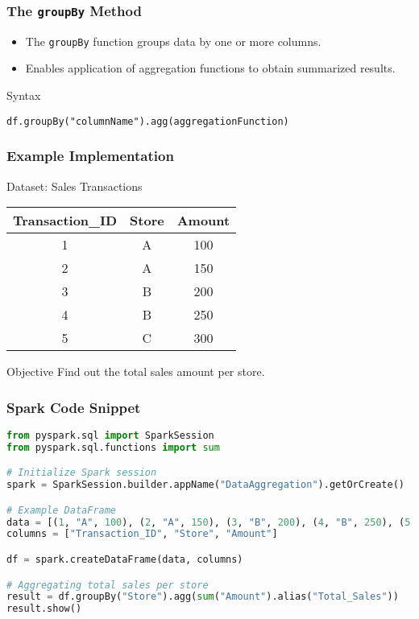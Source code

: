 \documentclass[aspectratio=169]{beamer}
\begin{document}
\begin{frame}[fragile]
    \frametitle{The \texttt{groupBy} Method}
    \begin{itemize}
        \item The \texttt{groupBy} function groups data by one or more columns.
        \item Enables application of aggregation functions to obtain summarized results.
    \end{itemize}
    
    \begin{block}{Syntax}
    \begin{lstlisting}
df.groupBy("columnName").agg(aggregationFunction)
    \end{lstlisting}
    \end{block}
\end{frame}

\begin{frame}
    \frametitle{Example Implementation}
    \begin{block}{Dataset: Sales Transactions}
        \begin{tabular}{|c|c|c|}
            \hline
            Transaction\_ID & Store & Amount \\
            \hline
            1 & A & 100 \\
            2 & A & 150 \\
            3 & B & 200 \\
            4 & B & 250 \\
            5 & C & 300 \\
            \hline
        \end{tabular}
    \end{block}
    
    \begin{block}{Objective}
        Find out the total sales amount per store.
    \end{block}
\end{frame}

\begin{frame}[fragile]
    \frametitle{Spark Code Snippet}
    \begin{lstlisting}[language=Python]
from pyspark.sql import SparkSession
from pyspark.sql.functions import sum

# Initialize Spark session
spark = SparkSession.builder.appName("DataAggregation").getOrCreate()

# Example DataFrame
data = [(1, "A", 100), (2, "A", 150), (3, "B", 200), (4, "B", 250), (5, "C", 300)]
columns = ["Transaction_ID", "Store", "Amount"]

df = spark.createDataFrame(data, columns)

# Aggregating total sales per store
result = df.groupBy("Store").agg(sum("Amount").alias("Total_Sales"))
result.show()
    \end{lstlisting}
\end{frame}
\end{document}
